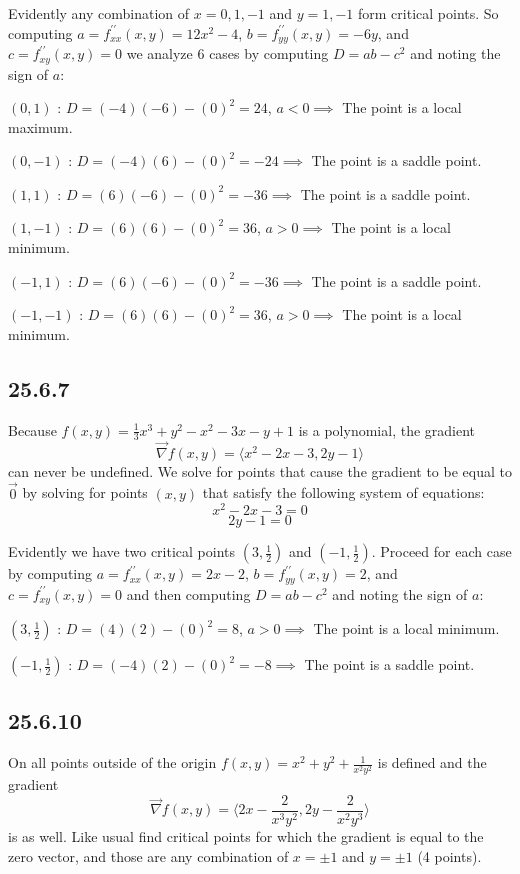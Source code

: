 \documentclass{article}
\begin{document}
Evidently any combination of $x=0,1,-1$ and $y = 1,-1$ form critical points. So computing $a = f^{\prime \prime}_{xx}(x,y) = 12x^2-4$, $b = f^{\prime \prime}_{yy}(x,y) = -6y$, and $c = f^{\prime \prime}_{xy}(x,y) = 0$ we analyze 6 cases by computing $D = ab-c^2$ and noting the sign of $a$:

$(0,1)$ : $D = (-4)(-6)-(0)^2 = 24$, $a < 0 \implies$ The point is a local maximum.

$(0,-1)$ : $D = (-4)(6)-(0)^2 = -24 \implies$ The point is a saddle point.

$(1,1)$ : $D = (6)(-6)-(0)^2 = -36 \implies$ The point is a saddle point.

$(1,-1)$ : $D = (6)(6)-(0)^2 = 36$, $a > 0 \implies$ The point is a local minimum.

$(-1,1)$ : $D = (6)(-6)-(0)^2 = -36 \implies$ The point is a saddle point.

$(-1,-1)$ : $D = (6)(6)-(0)^2 = 36$, $a > 0 \implies$ The point is a local minimum.

\subsection{25.6.7}

Because $f(x,y) = \frac{1}{3}x^3+y^2-x^2-3x-y+1$ is a polynomial, the gradient $$\vec{\nabla}f(x,y) = \langle x^2-2x-3, 2y-1\rangle$$ can never be undefined. We solve for points that cause the gradient to be equal to $\vec{0}$ by solving for points $(x,y)$ that satisfy the following system of equations:
$$x^2-2x-3 = 0$$
$$2y-1 = 0$$

Evidently we have two critical points $(3,\frac{1}{2})$ and $(-1,\frac{1}{2})$. Proceed for each case by computing $a = f^{\prime \prime}_{xx}(x,y) = 2x-2$, $b = f^{\prime \prime}_{yy}(x,y) = 2$, and $c = f^{\prime \prime}_{xy}(x,y) = 0$ and then computing $D = ab-c^2$ and noting the sign of $a$:

$(3,\frac{1}{2})$ : $D = (4)(2)-(0)^2 = 8$, $a > 0 \implies$ The point is a local minimum.

$(-1,\frac{1}{2})$ : $D = (-4)(2)-(0)^2 = -8 \implies$ The point is a saddle point.

\subsection{25.6.10}

On all points outside of the origin $f(x,y) = x^2 + y^2 + \frac{1}{x^2y^2}$ is defined and the gradient $$\vec{\nabla}f(x,y) = \langle 2x-\frac{2}{x^3y^2}, 2y-\frac{2}{x^2y^3} \rangle$$ is as well. Like usual find critical points for which the gradient is equal to the zero vector, and those are any combination of $x = \pm 1$ and $y = \pm 1$ (4 points).
\end{document}
